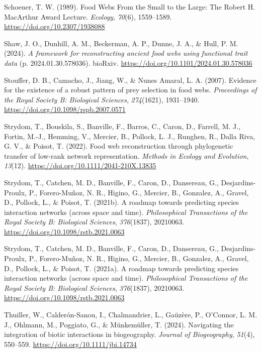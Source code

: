 \documentclass[
]{article}
\newlength{\cslhangindent}
\newenvironment{CSLReferences}[2] %
 {\begin{list}{}{%
  \setlength{\itemindent}{0pt}
  \setlength{\leftmargin}{0pt}
  \setlength{\parsep}{0pt}
  \ifodd #1
   \setlength{\leftmargin}{\cslhangindent}
   \setlength{\itemindent}{-1\cslhangindent}
  \fi
  \setlength{\itemsep}{#2\baselineskip}}}
 {\end{list}}
\begin{document}
\begin{CSLReferences}{1}{0}
Schoener, T. W. (1989). Food Webs From the Small to the Large: The
Robert H. MacArthur Award Lecture. \emph{Ecology}, \emph{70}(6),
1559--1589. \url{https://doi.org/10.2307/1938088}

Shaw, J. O., Dunhill, A. M., Beckerman, A. P., Dunne, J. A., \& Hull, P.
M. (2024). \emph{A framework for reconstructing ancient food webs using
functional trait data} (p. 2024.01.30.578036). bioRxiv.
\url{https://doi.org/10.1101/2024.01.30.578036}

Stouffer, D. B., Camacho, J., Jiang, W., \& Nunes Amaral, L. A. (2007).
Evidence for the existence of a robust pattern of prey selection in food
webs. \emph{Proceedings of the Royal Society B: Biological Sciences},
\emph{274}(1621), 1931--1940.
\url{https://doi.org/10.1098/rspb.2007.0571}

Strydom, T., Bouskila, S., Banville, F., Barros, C., Caron, D., Farrell,
M. J., Fortin, M.-J., Hemming, V., Mercier, B., Pollock, L. J., Runghen,
R., Dalla Riva, G. V., \& Poisot, T. (2022). Food web reconstruction
through phylogenetic transfer of low-rank network representation.
\emph{Methods in Ecology and Evolution}, \emph{13}(12).
\url{https://doi.org/10.1111/2041-210X.13835}

Strydom, T., Catchen, M. D., Banville, F., Caron, D., Dansereau, G.,
Desjardins-Proulx, P., Forero-Muñoz, N. R., Higino, G., Mercier, B.,
Gonzalez, A., Gravel, D., Pollock, L., \& Poisot, T. (2021b). A roadmap
towards predicting species interaction networks (across space and time).
\emph{Philosophical Transactions of the Royal Society B: Biological
Sciences}, \emph{376}(1837), 20210063.
\url{https://doi.org/10.1098/rstb.2021.0063}

Strydom, T., Catchen, M. D., Banville, F., Caron, D., Dansereau, G.,
Desjardins-Proulx, P., Forero-Muñoz, N. R., Higino, G., Mercier, B.,
Gonzalez, A., Gravel, D., Pollock, L., \& Poisot, T. (2021a). A roadmap
towards predicting species interaction networks (across space and time).
\emph{Philosophical Transactions of the Royal Society B: Biological
Sciences}, \emph{376}(1837), 20210063.
\url{https://doi.org/10.1098/rstb.2021.0063}

Thuiller, W., Calderón-Sanou, I., Chalmandrier, L., Gaüzère, P.,
O'Connor, L. M. J., Ohlmann, M., Poggiato, G., \& Münkemüller, T.
(2024). Navigating the integration of biotic interactions in
biogeography. \emph{Journal of Biogeography}, \emph{51}(4), 550--559.
\url{https://doi.org/10.1111/jbi.14734}


\end{CSLReferences}
\end{document}
